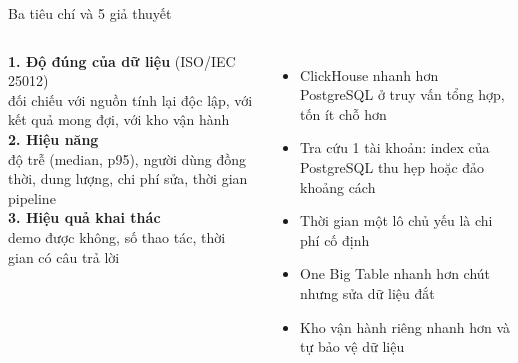 \documentclass[aspectratio=169,11pt]{beamer}
\begin{document}
\begin{frame}{Ba tiêu chí và 5 giả thuyết}
  \begin{columns}[T]
    \small
    \textbf{1. Độ đúng của dữ liệu} (ISO/IEC 25012)\\
    \footnotesize đối chiếu với nguồn tính lại độc lập, với kết quả mong đợi, với kho vận hành\\[4pt]
    \small\textbf{2. Hiệu năng}\\
    \footnotesize độ trễ (median, p95), người dùng đồng thời, dung lượng, chi phí sửa, thời gian pipeline\\[4pt]
    \small\textbf{3. Hiệu quả khai thác}\\
    \footnotesize demo được không, số thao tác, thời gian có câu trả lời
    \footnotesize
    \begin{itemize}
      \item[H1] ClickHouse nhanh hơn PostgreSQL ở truy vấn tổng hợp, tốn ít chỗ hơn
      \item[H2] Tra cứu 1 tài khoản: index của PostgreSQL thu hẹp hoặc đảo khoảng cách
      \item[H3] Thời gian một lô chủ yếu là chi phí cố định
      \item[H4] One Big Table nhanh hơn chút nhưng sửa dữ liệu đắt
      \item[H5] Kho vận hành riêng nhanh hơn và tự bảo vệ dữ liệu
    \end{itemize}
  \end{columns}
\end{frame}
\end{document}
